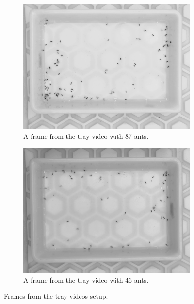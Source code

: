 \begin{figure}[!p]
    \centering
    \begin{subfigure}[b]{0.4\linewidth}
        \includegraphics[width=\linewidth]{figures/05_methodology/thirds_video_all.png}
        \caption[Frame from the more crowded tray video]{\footnotesize{A frame from the tray video with 87 ants.}}
        \label{fig:frame third video all}
    \end{subfigure}
    \hspace{0.025\linewidth}
    \begin{subfigure}[b]{0.4\linewidth}
        \includegraphics[width=\linewidth]{figures/05_methodology/thirds_video_set.png}
        \caption[Frame from the less crowded tray video]{\footnotesize{A frame from the tray video with 46 ants.}}
        \label{fig:frame third video set}
    \end{subfigure}
    \caption[Frames from the tray videos setup]{\footnotesize{Frames from the tray videos setup.}}
    \label{fig:frame third video}
\end{figure}
